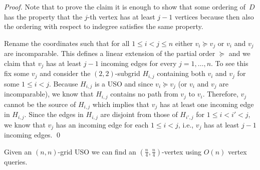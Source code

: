 \documentclass[runningheads,a4paper]{llncs}
\newcommand{\JN}[1]{\marginpar{\parbox{3.6cm}{{\small {\bf JN:} #1}}}} %
\begin{document}
\begin{proof}
Note that to prove the claim it is enough to show that some ordering of~$D$ has the property that the $j$-th vertex has at least $j-1$ vertices because then also the ordering with respect to indegree satisfies the same property. 

Rename the coordinates such that for all $1 \leq i < j\leq n$ either $v_i \succeq v_j$ or $v_i$ and $v_j$ are incomparable. 
This defines a linear extension of the partial order $\succeq$ and we claim that $v_j$ has at least $j-1$ incoming edges for every $j = 1, \ldots, n$. 
To see this fix some $v_j$ and consider the $(2,2)$-subgrid $H_{i,j}$ containing both $v_i$ and $v_j$ for some $1\leq i < j$. 
Because $H_{i,j}$ is a USO and since $v_i \succeq v_j$ (or $v_i$ and $v_j$ are incomparable), we know that $H_{i,j}$ contains no path from $v_j$ to $v_i$. 
Therefore, $v_j$ cannot be the source of $H_{i,j}$  which implies that $v_j$ has at least one incoming edge in $H_{i,j}$. 
Since the edges in $H_{i,j}$ are disjoint from those of $H_{i',j}$ for $1\leq i < i' < j$, 
we know that $v_j$ has an incoming edge for each $1\leq i< j$, i.e., $v_j$ has at least $j-1$ incoming edges. 
 \qed
\end{proof}



\begin{lemma}
\label{lem:seed_lemma_for_square_matrices}
 Given an $(n, n)$-grid USO we can find an $(\frac{n}{4}, \frac{n}{4})$-vertex using $O(n)$ vertex queries.
\end{lemma}
\end{document}
